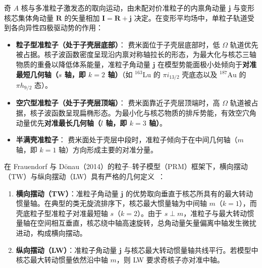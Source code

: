 奇 $A$ 核与多准粒子激发态的取向运动，由未配对价准粒子的内禀角动量 $\mathbf{j}$ 与变形核芯集体角动量 $\mathbf{R}$ 的矢量相加 $\mathbf{I} = \mathbf{R} + \mathbf{j}$ 决定。在变形平均场中，单粒子轨道受到各向异性四极驱动势的作用：
\begin{itemize}
\item \textbf{粒子型准粒子（处于子壳层底部）}：
费米面位于子壳层底部时，低 $\Omega$ 轨道优先被占据。核子波函数密度呈现沿内禀对称轴拉长的形态，为最大化与核芯三轴物质的重叠以降低体系能量，准粒子角动量 $\mathbf{j}$ 在模型势能面极小处倾向于\textbf{对准最短几何轴（$s$ 轴，即 $k=2$ 轴）}（如 $^{163}\mathrm{Lu}$ 的 $\pi i_{13/2}$ 壳底态以及 $^{187}\mathrm{Au}$ 的 $\pi h_{9/2}$ 态）。
\item \textbf{空穴型准粒子（处于子壳层顶端）}：
费米面靠近子壳层顶端时，高 $\Omega$ 轨道被占据，核子波函数呈现扁椭形态。为最小化与核芯物质的排斥势能，有效空穴角动量优先\textbf{对准最长几何轴（$l$ 轴，即 $k=3$ 轴）}。
\item \textbf{半满壳准粒子}：
费米面处于壳层中段时，准粒子倾向于在中间几何轴（$m$ 轴，即 $k=1$ 轴）方向形成主要的对准分量。
\end{itemize}

在 Frauendorf 与 Dönau（2014）的粒子--转子模型（PRM）框架下，横向摆动（TW）与纵向摆动（LW）具有严格的几何定义~\cite{frauendorf-2014-transverse-wobbling}：
\begin{enumerate}
\item \textbf{横向摆动（TW）}：准粒子角动量 $\mathbf{j}$ 的优势取向垂直于核芯所具有的最大转动惯量轴。在典型的类无旋流排序下，核芯最大惯量轴为中间轴 $m$（$k=1$），而壳底粒子型准粒子对准最短轴 $s$（$k=2$）。由于 $s \perp m$，准粒子与最大转动惯量轴在空间相互垂直，核芯绕中轴高速旋转，总角动量矢量偏离中轴发生微扰进动，构成横向摆动。
\item \textbf{纵向摆动（LW）}：准粒子角动量 $\mathbf{j}$ 与核芯最大转动惯量轴共线平行。若模型中核芯最大转动惯量依然沿中轴 $m$，则 LW 要求奇核子亦对准中轴。
\end{enumerate}

